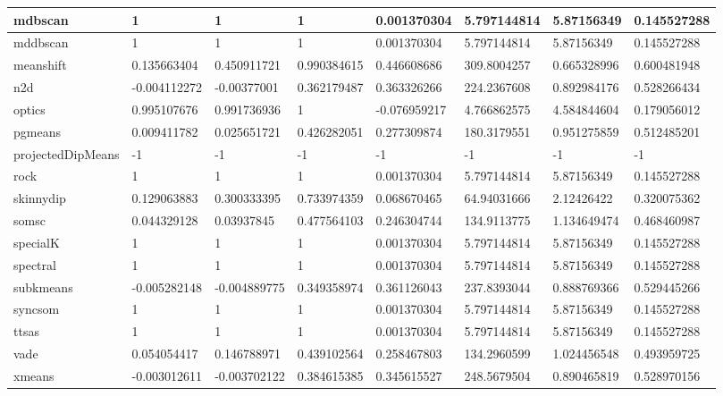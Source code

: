 \begin{table}[H]
\begin{tabular}{|l|l|l|l|l|l|l|l|}
\hline
mdbscan & 1 & 1 & 1 & 0.001370304 & 5.797144814 & 5.87156349 & 0.145527288 \\
\hline
mddbscan & 1 & 1 & 1 & 0.001370304 & 5.797144814 & 5.87156349 & 0.145527288 \\
\hline
meanshift & 0.135663404 & 0.450911721 & 0.990384615 & 0.446608686 & 309.8004257 & 0.665328996 & 0.600481948 \\
\hline
n2d & -0.004112272 & -0.00377001 & 0.362179487 & 0.363326266 & 224.2367608 & 0.892984176 & 0.528266434 \\
\hline
optics & 0.995107676 & 0.991736936 & 1 & -0.076959217 & 4.766862575 & 4.584844604 & 0.179056012 \\
\hline
pgmeans & 0.009411782 & 0.025651721 & 0.426282051 & 0.277309874 & 180.3179551 & 0.951275859 & 0.512485201 \\
\hline
projectedDipMeans & -1 & -1 & -1 & -1 & -1 & -1 & -1 \\
\hline
rock & 1 & 1 & 1 & 0.001370304 & 5.797144814 & 5.87156349 & 0.145527288 \\
\hline
skinnydip & 0.129063883 & 0.300333395 & 0.733974359 & 0.068670465 & 64.94031666 & 2.12426422 & 0.320075362 \\
\hline
somsc & 0.044329128 & 0.03937845 & 0.477564103 & 0.246304744 & 134.9113775 & 1.134649474 & 0.468460987 \\
\hline
specialK & 1 & 1 & 1 & 0.001370304 & 5.797144814 & 5.87156349 & 0.145527288 \\
\hline
spectral & 1 & 1 & 1 & 0.001370304 & 5.797144814 & 5.87156349 & 0.145527288 \\
\hline
subkmeans & -0.005282148 & -0.004889775 & 0.349358974 & 0.361126043 & 237.8393044 & 0.888769366 & 0.529445266 \\
\hline
syncsom & 1 & 1 & 1 & 0.001370304 & 5.797144814 & 5.87156349 & 0.145527288 \\
\hline
ttsas & 1 & 1 & 1 & 0.001370304 & 5.797144814 & 5.87156349 & 0.145527288 \\
\hline
vade & 0.054054417 & 0.146788971 & 0.439102564 & 0.258467803 & 134.2960599 & 1.024456548 & 0.493959725 \\
\hline
xmeans & -0.003012611 & -0.003702122 & 0.384615385 & 0.345615527 & 248.5679504 & 0.890465819 & 0.528970156 \\
\hline
\end{tabular}
\end{table}
